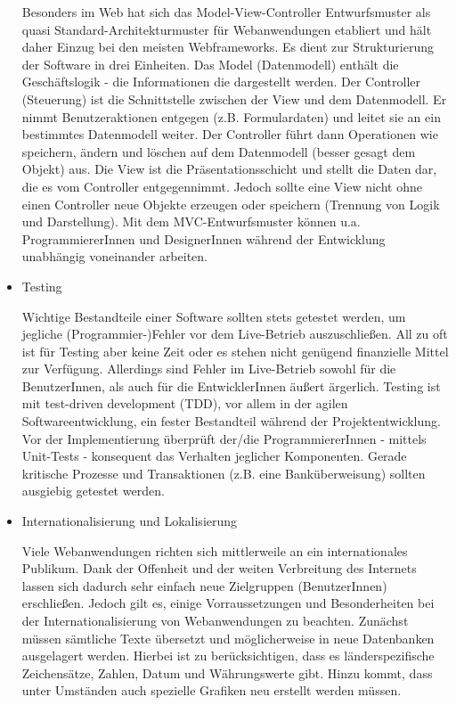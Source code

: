 \documentclass[abstracton, listof=totocnumbered,
bibliography=totocnumbered]{scrreprt}
\begin{document}
\begin{itemize}
Besonders im Web hat sich das Model-View-Controller Entwurfsmuster als quasi
Standard-Architekturmuster für Webanwendungen etabliert und hält daher Einzug
bei den meisten Webframeworks. Es dient zur Strukturierung der Software in drei
Einheiten. Das Model (Datenmodell) enthält die Geschäftslogik - die
Informationen die dargestellt werden. Der Controller (Steuerung) ist die
Schnittstelle zwischen der View und dem Datenmodell. Er nimmt Benutzeraktionen
entgegen (z.B. Formulardaten) und leitet sie an ein bestimmtes Datenmodell
weiter. Der Controller führt dann Operationen wie speichern, ändern und löschen
auf dem Datenmodell (besser gesagt dem Objekt) aus. Die View ist die
Präsentationsschicht und stellt die Daten dar, die es vom Controller
entgegennimmt. Jedoch sollte eine View nicht ohne einen Controller neue Objekte
erzeugen oder speichern (Trennung von Logik und Darstellung). Mit dem
MVC-Entwurfsmuster können u.a. ProgrammiererInnen und DesignerInnen während der
Entwicklung unabhängig voneinander arbeiten.

  \item Testing

Wichtige Bestandteile einer Software sollten stets getestet werden, um jegliche
(Programmier-)Fehler vor dem Live-Betrieb auszuschließen. All zu oft ist für
Testing aber keine Zeit oder es stehen nicht genügend finanzielle Mittel zur
Verfügung. Allerdings sind Fehler im Live-Betrieb sowohl für die BenutzerInnen,
als auch für die EntwicklerInnen äußert ärgerlich. Testing ist mit test-driven
development (TDD), vor allem in der agilen Softwareentwicklung, ein fester
Bestandteil während der Projektentwicklung. Vor der Implementierung überprüft
der/die ProgrammiererInnen - mittels Unit-Tests - konsequent das Verhalten
jeglicher Komponenten. Gerade kritische Prozesse und Transaktionen (z.B. eine
Banküberweisung) sollten ausgiebig getestet werden.

  \item Internationalisierung und Lokalisierung

Viele Webanwendungen richten sich mittlerweile an ein internationales Publikum.
Dank der Offenheit und der weiten Verbreitung des Internets lassen sich dadurch
sehr einfach neue Zielgruppen (BenutzerInnen) erschließen. Jedoch gilt es,
einige Vorraussetzungen und Besonderheiten bei der Internationalisierung von
Webanwendungen zu beachten. Zunächst müssen sämtliche Texte übersetzt und
möglicherweise in neue Datenbanken ausgelagert werden. Hierbei ist zu
berücksichtigen, dass es länderspezifische Zeichensätze, Zahlen, Datum und
Währungswerte gibt. Hinzu kommt, dass unter Umständen auch spezielle Grafiken
neu erstellt werden müssen.


\end{itemize}
\end{document}
